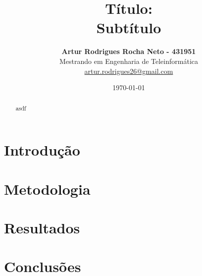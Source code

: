 \documentclass[a4paper]{article}
\title{
    Título: \\
    Subtítulo \\
}
\author{
    \textbf{Artur Rodrigues Rocha Neto - 431951} \\
    Mestrando em Engenharia de Teleinformática \\
    \url{artur.rodrigues26@gmail.com} \\
}
\date{\today}
\begin{document}
\maketitle

\begin{abstract}
    asdf
\end{abstract}

\section{Introdução}\label{sec-introducao}

\section{Metodologia}\label{sec-metodologia}

\section{Resultados}\label{sec-resultados}

\section{Conclusões}\label{sec-conclusoes}

\begin{footnotesize}
    
    
\end{footnotesize}
\end{document}
